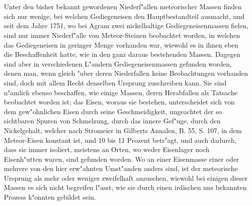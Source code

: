 \documentclass[a4paper, 11pt, oneside, polutonikogreek, german]{article}
\begin{document}
\section{}
\subsection{}
\paragraph{}
Unter den bisher bekannt gewordenen Niederf"allen meteorischer Massen finden sich nur wenige, bei welchen Gediegeneisen den Hauptbestandteil ausmacht, und seit dem Jahre 1751, wo bei Agram zwei nickelhaltige Gediegeneisenmassen fielen, sind nur immer Niederf"alle von Meteor-Steinen beobachtet worden, in welchen das Gediegeneisen in geringer Menge vorhanden war, wiewohl es in ihnen eben die Beschaffenheit hatte, wie in den ganz daraus bestehenden Massen. Dagegen sind aber in verschiedenen L"andern Gediegeneisenmassen gefunden worden, denen man, wenn gleich "uber deren Niederfallen keine Beobachtungen vorhanden sind, doch mit allem Recht denselben Ursprung zuschreiben kann. Sie sind n"amlich ebenso beschaffen, wie einige Massen, deren Herabfallen als Tatsache beobachtet worden ist; das Eisen, woraus sie bestehen, unterscheidet sich von dem gew"ohnlichen Eisen durch seine Geschmeidigkeit, ungeachtet der so sichtbaren Spuren von Schmelzung, durch das innere Gef"uge, durch den Nickelgehalt, welcher nach Stromeier in Gilberts Annalen, B. 55, S. 107, in dem Meteor-Eisen konstant ist, und 10 bis 11 Prozent betr"agt, und auch dadurch, dass sie immer isoliert, meistens an Orten, wo weder Eisenlager noch Eisenh"utten waren, sind gefunden worden. Wo an einer Eisenmasse einer oder mehrere von den hier erw"ahnten Umst"anden anders sind, ist der meteorische Ursprung als mehr oder weniger zweifelhaft anzusehen, wiewohl bei einigen dieser Massen es sich nicht begreifen l"asst, wie sie durch einen irdischen uns bekannten Prozess k"onnten gebildet sein.
\end{document}
